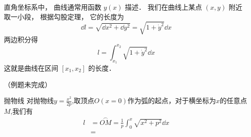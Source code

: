 

直角坐标系中， 曲线通常用函数 $y(x)$ 描述． 我们在曲线上某点 $(x, y)$ 附近取一小段， 根据勾股定理， 它的长度为
\begin{equation}
\dd{l} = \sqrt{\dd{x}^2 + \dd{y}^2} = \sqrt{1 + \dot y^2} \dd{x}
\end{equation}
两边积分得
\begin{equation}\label{CurLen_eq1}
l = \int_{x_1}^{x_2} \sqrt{1 + \dot y^2} \dd{x}
\end{equation}
这就是曲线在区间 $[x_1, x_2]$ 的长度．

（例题未完成）
\begin{example}{抛物线}
对抛物线$y=\frac{x^2}{2p}$,取顶点$O(x=0)$作为弧的起点，对于横坐标为$x$的任意点$M$,我们有
\begin{equation}
\begin{aligned}
l&=\overset{\frown}{OM}=\frac{1}{p}\int_{0}^{x}\sqrt{x^2+p^2}\dd{x}\\
&=
\end{aligned}
\end{equation}

\end{example}